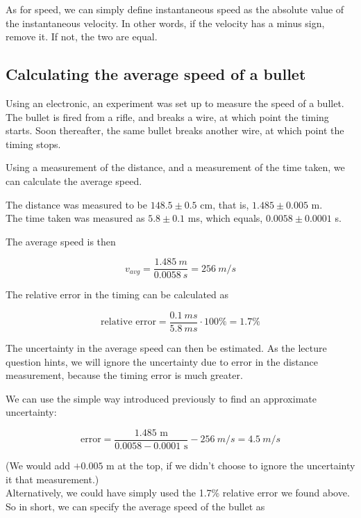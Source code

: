 \documentclass[8.01x]{subfiles}
\begin{document}
As for speed, we can simply define instantaneous speed as the absolute value of the instantaneous velocity. In other words, if the velocity has a minus sign, remove it. If not, the two are equal.

\subsection{Calculating the average speed of a bullet}

Using an electronic, an experiment was set up to measure the speed of a bullet. The bullet is fired from a rifle, and breaks a wire, at which point the timing starts. Soon thereafter, the same bullet breaks another wire, at which point the timing stops.

Using a measurement of the distance, and a measurement of the time taken, we can calculate the average speed.

The distance was measured to be $148.5 \pm 0.5$ cm, that is, $1.485 \pm 0.005$ m.\\
The time taken was measured as $5.8 \pm 0.1$ ms, which equals, $0.0058 \pm 0.0001$ s.

The average speed is then

\begin{equation}
v_{avg} = \frac{\SI{1.485}{m}}{\SI{0.0058}{s}} = \SI{256}{m/s}
\end{equation}

The relative error in the timing can be calculated as 

\begin{equation}
\text{relative error} = \frac{\SI{0.1}{ms}}{\SI{5.8}{ms}} \cdot 100\% = 1.7\% 
\end{equation}

The uncertainty in the average speed can then be estimated. As the lecture question hints, we will ignore the uncertainty due to error in the distance measurement, because the timing error is much greater.

We can use the simple way introduced previously to find an approximate uncertainty:

\begin{equation}
\text{error} = \frac{1.485 \text{ m}}{0.0058 - 0.0001 \text{ s}} - \SI{256}{m/s} = \SI{4.5}{m/s}
\end{equation}

(We would add $+0.005$ m at the top, if we didn't choose to ignore the uncertainty it that measurement.)\\
Alternatively, we could have simply used the 1.7\% relative error we found above.\\
So in short, we can specify the average speed of the bullet as
\end{document}
